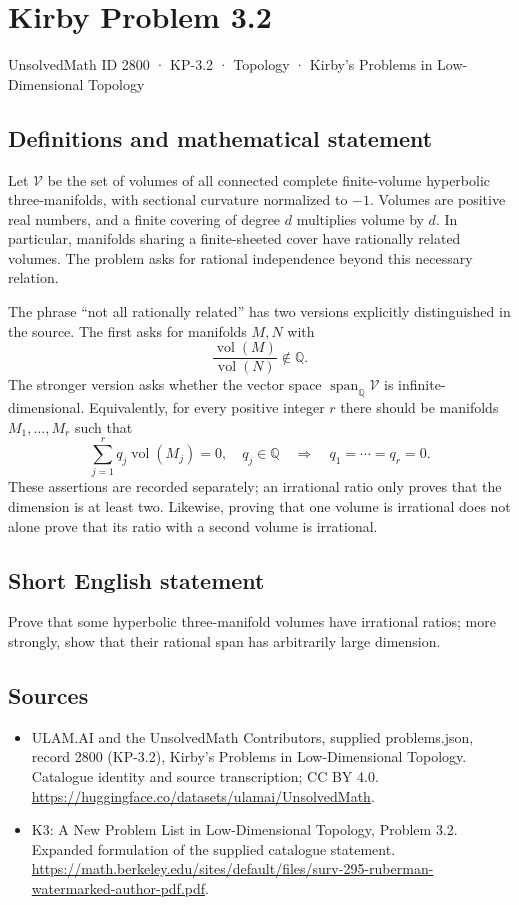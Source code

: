 \documentclass[11pt,a4paper]{article}
\begin{document}
\section*{Kirby Problem 3.2}\label{2800}
{\small UnsolvedMath ID 2800 · KP-3.2 · Topology · Kirby's Problems in Low-Dimensional Topology}
\subsection{Definitions and mathematical statement}
Let $\mathcal V$ be the set of volumes of all connected complete finite-volume
hyperbolic three-manifolds, with sectional curvature normalized to $-1$.
Volumes are positive real numbers, and a finite covering of degree $d$
multiplies volume by $d$. In particular, manifolds sharing a finite-sheeted
cover have rationally related volumes. The problem asks for rational
independence beyond this necessary relation.

The phrase ``not all rationally related'' has two versions explicitly
distinguished in the source. The first asks for manifolds $M,N$ with
\[
 \frac{\operatorname{vol}(M)}{\operatorname{vol}(N)}\notin\mathbb Q.
\]
The stronger version asks whether the vector space
$\operatorname{span}_{\mathbb Q}\mathcal V$ is infinite-dimensional.
Equivalently, for every positive integer $r$ there should be manifolds
$M_1,\ldots,M_r$ such that
\[
 \sum_{j=1}^r q_j\operatorname{vol}(M_j)=0,
 \quad q_j\in\mathbb Q
 \quad\Longrightarrow\quad q_1=\cdots=q_r=0.
\]
These assertions are recorded separately; an irrational ratio only proves
that the dimension is at least two. Likewise, proving that one volume is
irrational does not alone prove that its ratio with a second volume is irrational.
\subsection{Short English statement}
Prove that some hyperbolic three-manifold volumes have irrational ratios; more strongly, show that their rational span has arbitrarily large dimension.
\subsection{Sources}
\begin{itemize}
\item[S1] ULAM.AI and the UnsolvedMath Contributors, supplied problems.json, record 2800 (KP-3.2), Kirby's Problems in Low-Dimensional Topology. Catalogue identity and source transcription; CC BY 4.0.
\url{https://huggingface.co/datasets/ulamai/UnsolvedMath}.
\item[S2] K3: A New Problem List in Low-Dimensional Topology, Problem 3.2. Expanded formulation of the supplied catalogue statement.
\url{https://math.berkeley.edu/sites/default/files/surv-295-ruberman-watermarked-author-pdf.pdf}.
\end{itemize}
\end{document}
